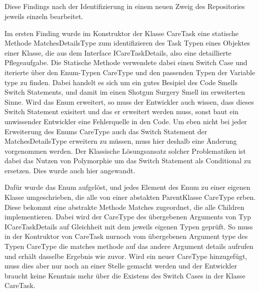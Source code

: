 \subsection*{}
Diese Findings nach der Identifizierung in einem neuen Zweig des Repositories jeweils einzeln bearbeitet.
\par
Im ersten Finding wurde im Konstruktor der Klasse CareTask eine statische Methode MatchesDetailsType zum identifizieren des Task Typen eines Objektes einer Klasse, die aus dem Interface ICareTaskDetails, also eine detaillierte Pflegeaufgabe. Die Statische Methode verwendete dabei einen Switch Case und iterierte über den Enum-Typen CareType und den passenden Typen der Variable type zu finden. Dabei handelt es sich um ein gutes Besipiel des Code Smells Switch Statements, und damit im einen Shotgun Surgery Smell im erweiterten Sinne. Wird das Enum erweitert, so muss der Entwickler auch wissen, dass dieses Switch Statement exisitert und das er erweitert werden muss, sonst baut ein unwissender Entwickler eine Fehlerquelle in den Code. Um eben nicht bei jeder Erweiterung des Enums CareType auch das Switch Statement der MatchesDetailsType erweitern zu müssen, muss hier deshalb eine Änderung vorgenommen werden.  Der Klassische Lösungsansatz solcher Problematiken ist dabei das Nutzen von Polymorphie um das Switch Statement als Conditional zu ersetzen. Dies wurde auch hier angewandt. 
\par
Dafür wurde das Enum aufgelöst, und jedes Element des Enum zu einer eigenen Klasse umgeschrieben, die alle von einer abstakten ParentKlasse CareType erben. Diese bekommt eine abstrakte Methode Matches zugeordnet, die alle Children implementieren. Dabei wird der CareType des übergebenen Arguments von Typ ICareTaskDetails auf Gleichheit mit dem jeweils eigenen Typen geprüft. So muss in der Kontruktor von CareTask nurnoch vom übergebenen Argument type des Typen CareType die matches methode auf das andere Argument details aufrufen und erhält dasselbe Ergebnis wie zuvor. Wird ein neuer CareType hinzugefügt, muss dies aber nur noch an einer Stelle gemacht werden und der Entwickler braucht keine Kenntnis mehr über die Existens des Switch Cases in der Klasse CareTask.
